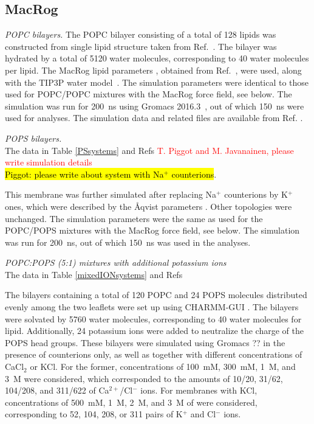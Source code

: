\documentclass[journal=jpcbfk]{achemso}
\newcommand{\todo}[1]{\textcolor{red}{#1}}
\begin{document}
\subsection{MacRog}
\noindent
{\it POPC bilayers.} 
The POPC bilayer consisting of a total of 128 lipids was constructed from single lipid structure taken 
from Ref.~. The bilayer was hydrated by a total of 5120 water 
molecules, corresponding to 40 water molecules per lipid.
The MacRog lipid parameters \cite{kulig15b}, obtained from Ref.~, were used,
along with the TIP3P water model~\cite{jorgensen83}. The simulation parameters were identical to those used for 
POPC/POPC mixtures with the MacRog force field, see below. The simulation was run for 200~ns using Gromacs 2016.3~\cite{abraham2015gromacs}, 
out of which 150~ns were used for analyses. The simulation data and related files are available from Ref. .

\noindent
{\it POPS bilayers.} \\
The data in Table \ref{PSsystems} and Refs 
\todo{T. Piggot and M. Javanainen, please write simulation details} \\
\hl{Piggot: please write about system with Na$^+$ counterions}.

This membrane was further simulated after replacing Na$^+$ counterions by K$^+$ ones, which 
were described by the \AA{}qvist parameters \cite{aqvist90}. Other topologies
were unchanged. The simulation parameters were the same as used for the POPC/POPS mixtures with 
the MacRog force field, see below. The simulation was run for 200~ns, out of which 150~ns was used 
in the analyses.

\noindent
{\it POPC:POPS (5:1) mixtures with additional potassium ions} \\
The data in Table \ref{mixedIONsystems} and Refs 

The bilayers containing a total of 120 POPC and 24 POPS molecules distributed evenly among the 
two leaflets were set up using CHARMM-GUI \cite{lee16,jo18}.
The bilayers were solvated by 5760 water molecules, corresponding to 40 water molecules for lipid.
Additionally, 24 potassium ions were added to neutralize the charge of the POPS head groups.
These bilayers were simulated using Gromacs ?? \cite{check the version} in the presence of counterions only, as well as together with different
concentrations of CaCl$_2$ or KCl. For the former, concentrations of 100~mM, 300~mM, 1~M, and 3~M 
were considered, which corresponded to the amounts of 10/20, 31/62, 104/208, and 311/622 
of Ca$^{2+}$/Cl$^-$ ions. For membranes with KCl, concentrations of 500~mM, 1~M, 2~M, and 3~M of 
were considered, corresponding to 52, 104, 208, or 311 pairs of K$^+$ and Cl$^-$ ions.
\end{document}
